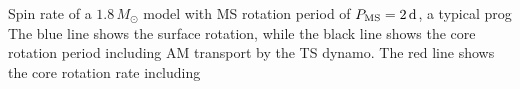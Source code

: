  \label{fig:MRI1.8rot} Spin rate of a $1.8 \, M_\odot$ model with MS rotation period of $P_{\rm MS} = 2 \, {\rm d}$, a typical prog The blue line shows the surface rotation, while the black line shows the core rotation period including AM transport by the TS dynamo. The red line shows the core rotation rate including